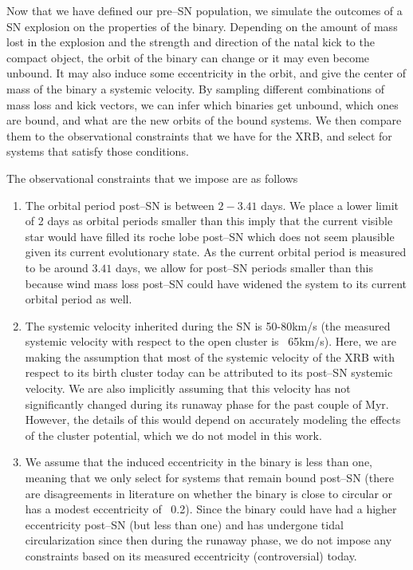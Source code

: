 \documentclass[linenumbers,trackchanges,twocolumn]{aastex701}
\begin{document}
Now that we have defined our pre--SN population, we simulate the outcomes of a SN explosion on the properties of the binary. Depending on the amount of mass lost in the explosion and the strength and direction of the natal kick to the compact object, the orbit of the binary can change or it may even become unbound. It may also induce some eccentricity in the orbit, and give the center of mass of the binary a systemic velocity. By sampling different combinations of mass loss and kick vectors, we can infer which binaries get unbound, which ones are bound, and what are the new orbits of the bound systems. We then compare them to the observational constraints that we have for the XRB, and select for systems that satisfy those conditions.

The observational constraints that we impose are as follows

\begin{enumerate}
        \item The orbital period post--SN is between $2-3.41$ days. We place a lower limit of 2 days as orbital periods smaller than this imply that the current visible star would have filled its roche lobe post--SN which does not seem plausible given its current evolutionary state. As the current orbital period is measured to be around $3.41$ days, we allow for post--SN periods smaller than this because wind mass loss post--SN could have widened the system to its current orbital period as well.
        \item The systemic velocity inherited during the SN is 50-80km/s (the measured systemic velocity with respect to the open cluster is ~65km/s). Here, we are making the assumption that most of the systemic velocity of the XRB with respect to its birth cluster today can be attributed to its post--SN systemic velocity. We are also implicitly assuming that this velocity has not significantly changed during its runaway phase for the past couple of Myr. However, the details of this would depend on accurately modeling the effects of the cluster potential, which we do not model in this work.
        \item We assume that the induced eccentricity in the binary is less than one, meaning that we only select for systems that remain bound post--SN (there are disagreements in literature on whether the binary is close to circular or has a modest eccentricity of ~0.2). Since the binary could have had a higher eccentricity post--SN (but less than one) and has undergone tidal circularization since then during the runaway phase, we do not impose any constraints based on its measured eccentricity (controversial) today.
\end{enumerate}
\end{document}
